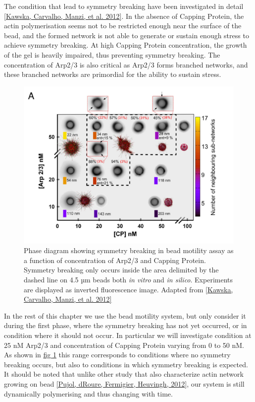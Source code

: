 \documentclass[A4paperpaper,11pt,english]{sphinxmanual}
\begin{document}
The condition that lead to symmetry breaking have been investigated in detail
{\hyperref[index-latex:kawska2012]{{[}Kawska, Carvalho, Manzi,  et al.  2012{]}}}. In the absence of Capping Protein, the actin polymerisation seems
not to be restricted enough near the surface of the bead, and the formed
network is not able to generate or sustain enough stress to achieve symmetry
breaking. At high Capping Protein concentration, the growth of the gel is heavily impaired,
thus preventing symmetry breaking. The concentration of Arp2/3 is also critical
as Arp2/3 forms branched networks, and these branched networks are primordial for the
ability to sustain stress.
\begin{figure}[htbp]
\centering
\capstart

\includegraphics[width=0.700\linewidth]{symmetry-breaking-phase-diagram.png}
\caption{Phase diagram showing symmetry breaking in bead motility assay as a
function of concentration of Arp2/3 and Capping Protein. Symmetry breaking
only occurs inside the area delimited by the dashed line on 4.5 µm beads both
\emph{in vitro} and \emph{in silico}. Experiments are
displayed as inverted fluorescence image. Adapted from {\hyperref[index-latex:kawska2012]{{[}Kawska, Carvalho, Manzi,  et al.  2012{]}}}}\label{index-latex:phase-diag}\end{figure}

In the rest of this chapter we use the bead motility system, but only
consider it during the first phase, where the symmetry breaking has not yet
occurred, or in condition where it should not occur. In particular we will
investigate condition at 25 nM Arp2/3 and concentration of Capping Protein
varying from 0 to 50 nM. As shown in \hyperref[index-latex:phase-diag]{fig  \ref*{index-latex:phase-diag}} this range corresponds to
conditions where no symmetry breaking occurs, but also to conditions in which
symmetry breaking is expected.  It should be noted that unlike
other study that also characterize actin network growing on bead
{\hyperref[index-latex:pujol2012]{{[}Pujol, dRoure, Fermigier, Heuvingh,  2012{]}}}, our system is still dynamically polymerising and thus
changing with time.
\end{document}

